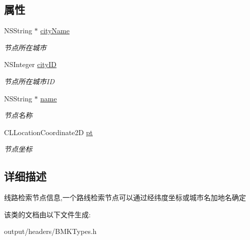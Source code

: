 \subsection*{属性}
\begin{DoxyCompactItemize}
\item 
\hypertarget{interface_b_m_k_plan_node_ae6181a2e46740e8422a0b0820eedd0bb}{}N\+S\+String $\ast$ \hyperlink{interface_b_m_k_plan_node_ae6181a2e46740e8422a0b0820eedd0bb}{city\+Name}\label{interface_b_m_k_plan_node_ae6181a2e46740e8422a0b0820eedd0bb}

\begin{DoxyCompactList}\small\item\em 节点所在城市 \end{DoxyCompactList}\item 
\hypertarget{interface_b_m_k_plan_node_a0c885fc9fd2f835aa82e944019b47835}{}N\+S\+Integer \hyperlink{interface_b_m_k_plan_node_a0c885fc9fd2f835aa82e944019b47835}{city\+I\+D}\label{interface_b_m_k_plan_node_a0c885fc9fd2f835aa82e944019b47835}

\begin{DoxyCompactList}\small\item\em 节点所在城市\+I\+D \end{DoxyCompactList}\item 
\hypertarget{interface_b_m_k_plan_node_afe487565841e6361610e53d77af75f65}{}N\+S\+String $\ast$ \hyperlink{interface_b_m_k_plan_node_afe487565841e6361610e53d77af75f65}{name}\label{interface_b_m_k_plan_node_afe487565841e6361610e53d77af75f65}

\begin{DoxyCompactList}\small\item\em 节点名称 \end{DoxyCompactList}\item 
\hypertarget{interface_b_m_k_plan_node_a1fa1ff65e104926cc145168df5261136}{}C\+L\+Location\+Coordinate2\+D \hyperlink{interface_b_m_k_plan_node_a1fa1ff65e104926cc145168df5261136}{pt}\label{interface_b_m_k_plan_node_a1fa1ff65e104926cc145168df5261136}

\begin{DoxyCompactList}\small\item\em 节点坐标 \end{DoxyCompactList}\end{DoxyCompactItemize}


\subsection{详细描述}
线路检索节点信息,一个路线检索节点可以通过经纬度坐标或城市名加地名确定 

该类的文档由以下文件生成\+:\begin{DoxyCompactItemize}
\item 
output/headers/B\+M\+K\+Types.\+h\end{DoxyCompactItemize}
